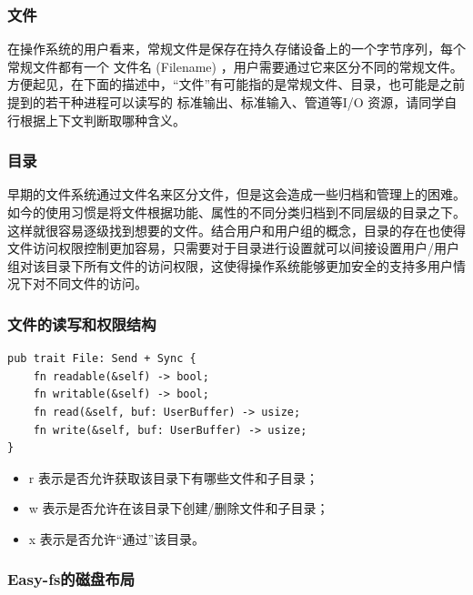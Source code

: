 \subsubsection{文件}

在操作系统的用户看来，常规文件是保存在持久存储设备上的一个字节序列，每个常规文件都有一个 文件名 (Filename) ，用户需要通过它来区分不同的常规文件。方便起见，在下面的描述中，“文件”有可能指的是常规文件、目录，也可能是之前提到的若干种进程可以读写的 标准输出、标准输入、管道等I/O 资源，请同学自行根据上下文判断取哪种含义。

\subsubsection{目录}

早期的文件系统通过文件名来区分文件，但是这会造成一些归档和管理上的困难。如今的使用习惯是将文件根据功能、属性的不同分类归档到不同层级的目录之下。这样就很容易逐级找到想要的文件。结合用户和用户组的概念，目录的存在也使得文件访问权限控制更加容易，只需要对于目录进行设置就可以间接设置用户/用户组对该目录下所有文件的访问权限，这使得操作系统能够更加安全的支持多用户情况下对不同文件的访问。

\subsubsection{文件的读写和权限结构}

\begin{lstlisting}[caption=文件系统基本读写]
pub trait File: Send + Sync {
    fn readable(&self) -> bool;
    fn writable(&self) -> bool;
    fn read(&self, buf: UserBuffer) -> usize;
    fn write(&self, buf: UserBuffer) -> usize;
}
\end{lstlisting}

\begin{itemize}
\item r 表示是否允许获取该目录下有哪些文件和子目录；
\item w 表示是否允许在该目录下创建/删除文件和子目录；
\item x 表示是否允许“通过”该目录。
\end{itemize}


\subsubsection{Easy-fs的磁盘布局}

